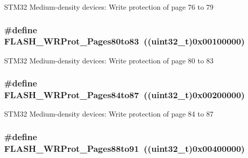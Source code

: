 \label{group__Option__Bytes__Write__Protection_ga9e1f9abfa57766312c6cbae9b42f3ab6}
STM32 Medium-\/density devices: Write protection of page 76 to 79 \hypertarget{group__Option__Bytes__Write__Protection_ga5749428874f99f77a5c5fc48a88816d9}{
\subsubsection[{FLASH\_\-WRProt\_\-Pages80to83}]{\setlength{\rightskip}{0pt plus 5cm}\#define FLASH\_\-WRProt\_\-Pages80to83~((uint32\_\-t)0x00100000)}}
\label{group__Option__Bytes__Write__Protection_ga5749428874f99f77a5c5fc48a88816d9}
STM32 Medium-\/density devices: Write protection of page 80 to 83 \hypertarget{group__Option__Bytes__Write__Protection_ga9dbf7aeb5b54b42f9b345c95d00eaf32}{
\subsubsection[{FLASH\_\-WRProt\_\-Pages84to87}]{\setlength{\rightskip}{0pt plus 5cm}\#define FLASH\_\-WRProt\_\-Pages84to87~((uint32\_\-t)0x00200000)}}
\label{group__Option__Bytes__Write__Protection_ga9dbf7aeb5b54b42f9b345c95d00eaf32}
STM32 Medium-\/density devices: Write protection of page 84 to 87 \hypertarget{group__Option__Bytes__Write__Protection_gaeece6aa5e198239067c47f678b9d015e}{
\subsubsection[{FLASH\_\-WRProt\_\-Pages88to91}]{\setlength{\rightskip}{0pt plus 5cm}\#define FLASH\_\-WRProt\_\-Pages88to91~((uint32\_\-t)0x00400000)}}
\label{group__Option__Bytes__Write__Protection_gaeece6aa5e198239067c47f678b9d015e}
